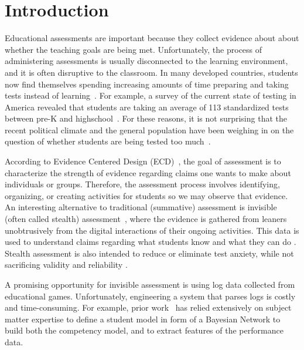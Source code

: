 \documentclass{sigchi}
\newcommand{\hl}[1]{\colorbox{yellow}{#1}}
\begin{document}
\section{Introduction}
Educational assessments are important because they collect evidence about about  whether  the teaching goals are being met.
Unfortunately, the process of  administering assessments is usually disconnected to the learning environment, and  it is often  disruptive to the classroom. 
In many developed countries, students now find themselves spending increasing amounts of time preparing and taking tests instead of learning~\cite{hofman2015rebalancing}.
For example, a  survey of the current state of testing in America revealed that students are taking an average of 113 standardized tests between pre-K and highschool~\cite{lazarin2014testing}.  %
For these reasons, it is not surprising that the recent political climate and the general population have been weighing in on the question of whether students are being tested too much~\cite{lazarin2014testing}.


According to Evidence Centered Design (ECD)~\cite{mislevy2012design}, the goal of assessment is to characterize the strength of evidence regarding claims one wants to make about individuals or groups.
Therefore, the assessment process involves identifying, organizing, or creating activities for students so we may observe that evidence.
	An interesting alternative to traditional (summative) assessment is invisible (often called stealth) assessment~\cite{shute2013stealth},
where the evidence is gathered from leaners unobtrusively from the digital interactions of their ongoing activities.
This data is used  to understand claims regarding what students know and what they can do \cite{shute2009melding}.
	Stealth assessment is also intended to reduce or eliminate test anxiety, while not sacrificing validity and reliability \cite{shute2008you}.


A promising opportunity for invisible assessment is using log data collected from educational games.
Unfortunately, engineering a system that parses logs is costly and time-consuming.
	For example, prior work~\cite{shute2013stealth, shute2009melding} has relied extensively on subject matter expertise to define a student model in form of a  Bayesian Network to build both the competency model, and to extract features of the performance data.
\end{document}

